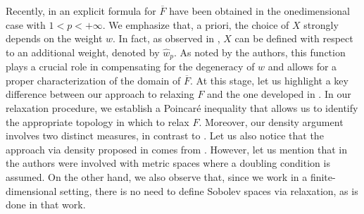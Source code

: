 \documentclass[11pt,leqno]{amsart}
\theoremstyle{remark}
\theoremstyle{definition}
\theoremstyle{definition}
\newcommand{\wstar}{{\hat w}}
\newcommand{\ov}[1]{\overline{#1}}
\begin{document}
Recently, in \cite{CCMH1} an explicit formula for $\ov{F}$  have been obtained in the onedimensional case with $1<p<+\infty$. We emphasize that, a priori, the choice of $X$ strongly depends on the weight $w$. In fact, as observed in \cite{CCMH1}, $X$ can be defined with respect to an additional weight, denoted by $\wstar_{p}$. As noted by the authors, this function plays a crucial role in compensating for the degeneracy of $w$ and allows for a proper characterization of the domain of $\overline{F}$.
At this stage, let us highlight a key difference between our approach to relaxing $F$ and the one developed in \cite{LAMB0}. In our relaxation procedure, we establish a Poincaré inequality that allows us to identify the appropriate topology in which to relax $F$. Moreover, our density argument involves two distinct measures, in contrast to \cite[Definition 5.2]{LAMB0}. Let us also notice that the approach via density proposed in \cite[Subsection 5.1]{LAMB0} comes from \cite{LAMB4}. However, let us mention that in \cite{LAMB4} the authors were involved with metric spaces where a doubling condition is assumed. On the other hand, we also observe that, since we work in a finite-dimensional setting, there is no need to define Sobolev spaces via relaxation, as is done in that work. 
\end{document}
